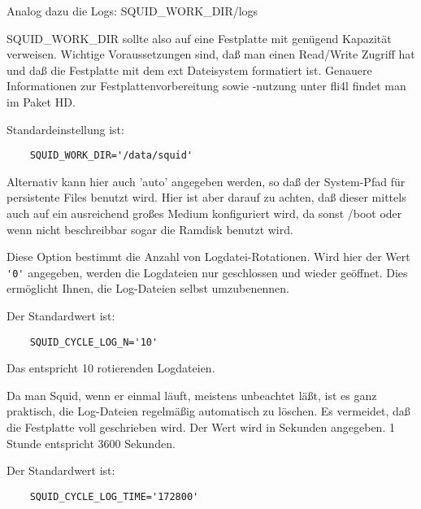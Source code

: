 \begin{description}
                Analog dazu die Logs:
                                SQUID\_WORK\_DIR/logs

                SQUID\_WORK\_DIR sollte also auf eine Festplatte mit genügend
                Kapazität verweisen. Wichtige Voraussetzungen sind, daß man
                einen Read/Write Zugriff hat und daß die Festplatte mit dem
                ext Dateisystem formatiert ist. Genauere Informationen zur
                Festplattenvorbereitung sowie -nutzung unter fli4l findet man
                im Paket HD.

                Standardeinstellung ist:
\begin{verbatim}
	SQUID_WORK_DIR='/data/squid'
\end{verbatim}

                Alternativ kann hier auch 'auto' angegeben werden, so daß der System-Pfad
                für persistente Files benutzt wird. Hier ist aber darauf zu achten, daß
                dieser mittels  auch auf ein ausreichend großes Medium
                konfiguriert wird, da sonst /boot oder wenn nicht beschreibbar sogar die
                Ramdisk benutzt wird.


                Diese Option bestimmt die Anzahl von Logdatei-Rotationen. Wird
                hier der Wert \verb+'0'+ angegeben, werden die Logdateien nur
                geschlossen und wieder geöffnet. Dies ermöglicht Ihnen, die Log-Dateien
                selbst umzubenennen.

                Der Standardwert ist:
\begin{verbatim}
	SQUID_CYCLE_LOG_N='10'
\end{verbatim}

                Das entspricht 10 rotierenden Logdateien.



                Da man Squid, wenn er einmal läuft, meistens unbeachtet läßt,
                ist es ganz praktisch, die Log-Dateien regelmäßig automatisch
                zu löschen. Es vermeidet, daß die Festplatte voll geschrieben
                wird. Der Wert wird in Sekunden angegeben. 1 Stunde entspricht
                3600 Sekunden.

                Der Standardwert ist:
\begin{verbatim}
	SQUID_CYCLE_LOG_TIME='172800'
\end{verbatim}


\end{description}
